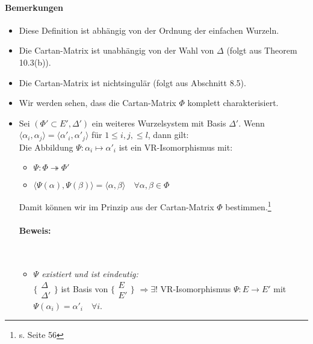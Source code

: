 \documentclass[a4paper,12pt]{article}
\begin{document}
\paragraph{Bemerkungen}
\begin{itemize}
\item Diese Definition ist abhängig von der Ordnung der einfachen Wurzeln.
\item Die Cartan-Matrix ist unabhängig von der Wahl von $\Delta$ (folgt aus Theorem 10.3(b)).
\item Die Cartan-Matrix ist nichtsingulär (folgt aus Abschnitt 8.5).
\item Wir werden sehen, dass die Cartan-Matrix $\Phi$ komplett charakterisiert.
\item Sei $(\Phi' \subset E' , \Delta')$ ein weiteres Wurzelsystem mit Basis $\Delta'$. Wenn $\langle \alpha_i, \alpha_j\rangle = \langle \alpha'_i, \alpha'_j \rangle$ für $1 \leq i,j,\leq l$, dann gilt:\\
Die Abbildung  $\Psi: \alpha_i \mapsto \alpha'_i$ ist ein VR-Isomorphismus mit:
	\begin{itemize}
	\item $\Psi: \Phi \twoheadrightarrow \Phi'$
	\item $\langle \Psi (\alpha), \Psi (\beta) \rangle = \langle\alpha,\beta\rangle \quad \forall \alpha, \beta \in \Phi$
	\end{itemize}
Damit können wir im Prinzip aus der Cartan-Matrix $\Phi$ bestimmen.\footnote{s. Seite 56}
\paragraph{Beweis:}\
\begin{itemize}
\item \emph{$\Psi$ existiert und ist eindeutig:}\\ $\lbrace \begin{array}{c}
\Delta \\ 
\Delta'
\end{array} \rbrace$ ist Basis von $\lbrace \begin{array}{c}
E \\ 
E'
\end{array} \rbrace$
$\Rightarrow \exists !$ VR-Isomorphismus $\Psi: E \rightarrow E'$ mit $\Psi (\alpha_i) = \alpha'_i \quad \forall i$.


\end{itemize}
\end{itemize}
\end{document}
